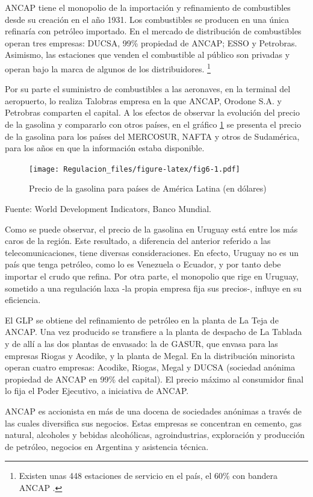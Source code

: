\documentclass[
  12pt,
  spanish,
]{book}
\begin{document}
ANCAP tiene el monopolio de la importación y refinamiento de combustibles desde su creación en el año 1931. Los combustibles se producen en una única refinaría con petróleo importado. En el mercado de distribución de combustibles operan tres empresas: DUCSA, 99\% propiedad de ANCAP; ESSO y Petrobras. Asimismo, las estaciones que venden el combustible al público son privadas y operan bajo la marca de algunos de los distribuidores.
\footnote{Existen unas 448 estaciones de servicio en el país, el 60\% con bandera ANCAP \citep{URSEA2013}.}

Por su parte el suministro de combustibles a las aeronaves, en la terminal del aeropuerto, lo realiza Talobras empresa en la que ANCAP, Orodone S.A. y Petrobras comparten el capital. A los efectos de observar la evolución del precio de la gasolina y compararlo con otros países, en el gráfico \ref{fig:fig6} se presenta el precio de la gasolina para los países del MERCOSUR, NAFTA y otros de Sudamérica, para los años en que la información estaba disponible.

\begin{figure}
\centering
\texttt{[image: Regulacion\_files/figure-latex/fig6-1.pdf]}
\caption{\label{fig:fig6}Precio de la gasolina para países de América Latina (en dólares)}
\end{figure}

Fuente: World Development Indicators, Banco Mundial.

Como se puede observar, el precio de la gasolina en Uruguay está entre los más caros de la región. Este resultado, a diferencia del anterior referido a las telecomunicaciones, tiene diversas consideraciones. En efecto, Uruguay no es un país que tenga petróleo, como lo es Venezuela o Ecuador, y por tanto debe importar el crudo que refina. Por otra parte, el monopolio que rige en Uruguay, sometido a una regulación laxa -la propia empresa fija sus precios-, influye en su eficiencia.

El GLP se obtiene del refinamiento de petróleo en la planta de La Teja de ANCAP. Una vez producido se transfiere a la planta de despacho de La Tablada y de allí a las dos plantas de envasado: la de GASUR, que envasa para las empresas Riogas y Acodike, y la planta de Megal. En la distribución minorista operan cuatro empresas: Acodike, Riogas, Megal y DUCSA (sociedad anónima propiedad de ANCAP en 99\% del capital). El precio máximo al consumidor final lo fija el Poder Ejecutivo, a iniciativa de ANCAP.

ANCAP es accionista en más de una docena de sociedades anónimas a través de las cuales diversifica sus negocios. Estas empresas se concentran en cemento, gas natural, alcoholes y bebidas alcohólicas, agroindustrias, exploración y producción de petróleo, negocios en Argentina y asistencia técnica.
\end{document}
